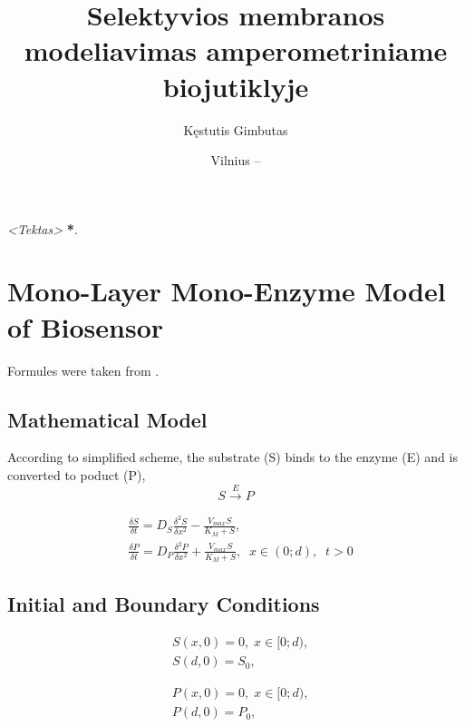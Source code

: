 \documentclass[12pt, a4paper, lithuanian]{article}
\title{Selektyvios membranos modeliavimas amperometriniame biojutiklyje}
\author{
   Kęstutis Gimbutas
}
\date{Vilnius – \the\year}
\begin{document}
\sloppy
\maketitle

\tableofcontents

\textit{<Tektas>} \textbf{*}.

\section{Mono-Layer Mono-Enzyme Model of Biosensor}
Formules were taken from \cite{baronas2009mathematical}.

\subsection{Mathematical Model}
According to simplified scheme, the substrate (S) binds to the enzyme (E) and is
converted to poduct (P),
\begin{equation}\label{eq:basic} 
    S \overset{E}{\rightarrow} P
\end{equation}

\begin{equation}
\begin{aligned} 
    &\frac{\delta S}{\delta t} = D_S \frac{\delta^2 S}{\delta x^2} -
    \frac{V_{max} S}{K_M + S},\\ 
    &\frac{\delta P}{\delta t} = D_P \frac{\delta^2 P}{\delta x^2} +
    \frac{V_{max} S}{K_M + S} ,\;\; x \in (0; d),\;\; t > 0
\end{aligned}
\end{equation}


\subsection{Initial and Boundary Conditions}
\begin{equation}
\begin{aligned}
    &S(x, 0) = 0,\; x \in [0;d),\\
    &S(d, 0) = S_0,
\end{aligned}
\end{equation}

\begin{equation}
\begin{aligned}
    &P(x, 0) = 0,\; x \in [0;d),\\
    &P(d, 0) = P_0,
\end{aligned}
\end{equation}
\end{document}
